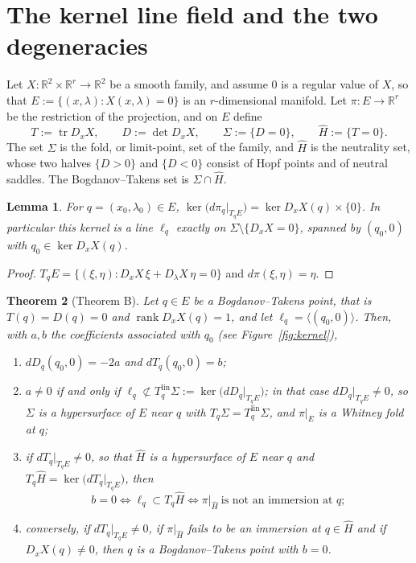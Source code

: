 \documentclass[12pt]{article}
\theoremstyle{plain}
\newtheorem{theorem}{Theorem}[section]
\newtheorem{lemma}[theorem]{Lemma}
\theoremstyle{definition}
\theoremstyle{remark}
\newcommand{\R}{\mathbb{R}}
\newcommand{\tr}{\operatorname{tr}}
\DeclareMathOperator{\dt}{det}
\DeclareMathOperator{\rank}{rank}
\newcommand{\Hh}{\widehat{H}}
\begin{document}
	
	\section{The kernel line field and the two degeneracies}
	\label{sec:geometry}
	
	Let $X\colon\R^{2}\times\R^{r}\to\R^{2}$ be a smooth family, and assume
	$0$ is a regular value of $X$, so that
	$E:=\{(x,\lambda): X(x,\lambda)=0\}$ is an $r$-dimensional manifold.
	Let $\pi\colon E\to\R^{r}$ be the restriction of the projection, and on
	$E$ define
	\[
	T:=\tr D_{x}X ,\qquad
	D:=\dt D_{x}X ,\qquad
	\Sigma:=\{D=0\},\qquad
	\Hh:=\{T=0\} .
	\]
	The set $\Sigma$ is the fold, or limit-point, set of the family, and
	$\Hh$ is the neutrality set, whose two halves $\{D>0\}$ and $\{D<0\}$
	consist of Hopf points and of neutral saddles.  The Bogdanov--Takens
	set is $\Sigma\cap\Hh$.
	
	\begin{lemma}\label{lem:kernel}
		For $q=(x_{0},\lambda_{0})\in E$,
		$\ker\bigl(d\pi_{q}|_{T_{q}E}\bigr)=\ker D_{x}X(q)\times\{0\}$.  In
		particular this kernel is a line $\ell_{q}$ exactly on
		$\Sigma\setminus\{D_{x}X=0\}$, spanned by $(q_{0},0)$ with
		$q_{0}\in\ker D_{x}X(q)$.
	\end{lemma}
	
	\begin{proof}
		$T_{q}E=\{(\xi,\eta): D_{x}X\,\xi+D_{\lambda}X\,\eta=0\}$ and
		$d\pi(\xi,\eta)=\eta$.
	\end{proof}
	
	\begin{theorem}[Theorem B]\label{thm:B}
		Let $q\in E$ be a Bogdanov--Takens point, that is $T(q)=D(q)=0$ and
		$\rank D_{x}X(q)=1$, and let $\ell_{q}=\langle(q_{0},0)\rangle$.  Then,
		with $a,b$ the coefficients associated with $q_{0}$ (see
		Figure~\ref{fig:kernel}),
		\begin{enumerate}[label=\rm(\roman*)]
			\item $dD_{q}(q_{0},0)=-2a$ and $dT_{q}(q_{0},0)=b$;
			\item $a\neq0$ if and only if
			$\ell_{q}\not\subset T^{\mathrm{lin}}_{q}\Sigma
			:=\ker\bigl(dD_{q}|_{T_{q}E}\bigr)$; in that case
			$dD_{q}|_{T_{q}E}\neq0$, so $\Sigma$ is a hypersurface of $E$ near $q$
			with $T_{q}\Sigma=T^{\mathrm{lin}}_{q}\Sigma$, and $\pi|_{E}$ is a
			Whitney fold at $q$;
			\item if $dT_{q}|_{T_{q}E}\neq0$, so that $\Hh$ is a hypersurface of
			$E$ near $q$ and $T_{q}\Hh=\ker\bigl(dT_{q}|_{T_{q}E}\bigr)$, then
			\[
			b=0
			\iff \ell_{q}\subset T_{q}\Hh
			\iff \pi|_{\Hh}\ \text{is not an immersion at }q ;
			\]
			\item conversely, if $dT_{q}|_{T_{q}E}\neq0$, if $\pi|_{\Hh}$ fails to
			be an immersion at $q\in\Hh$ and if $D_{x}X(q)\neq0$, then $q$ is a
			Bogdanov--Takens point with $b=0$.
		\end{enumerate}
	\end{theorem}
	
\end{document}

